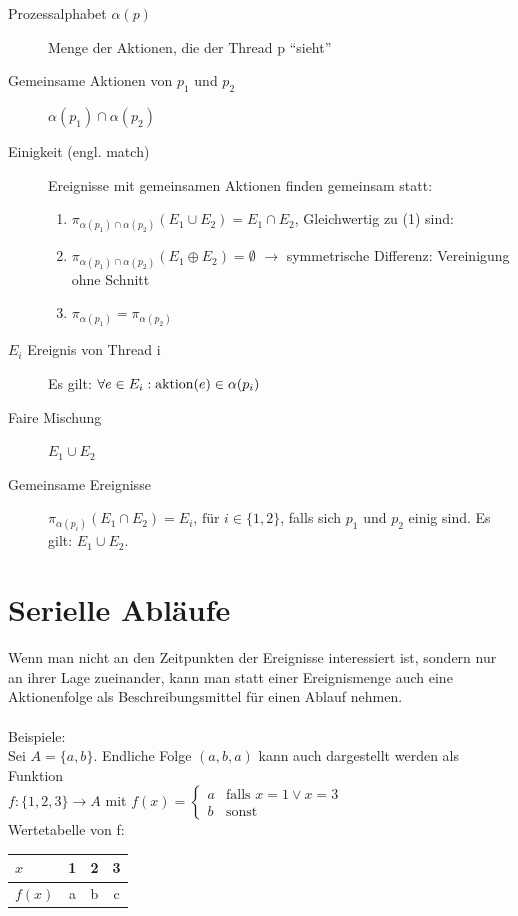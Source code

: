 \begin{description}
	\item[Prozessalphabet $\alpha(p)$] Menge der Aktionen, die der Thread p "`sieht"'
	\item[Gemeinsame Aktionen von $ p_1 $ und $ p_2 $] $ \alpha(p_1) \cap \alpha(p_2) $
	\item[Einigkeit (engl. match)] Ereignisse mit gemeinsamen Aktionen finden gemeinsam statt:
	\begin{enumerate} %
		\item $ \pi_{\alpha(p_1) \cap \alpha(p_2)}(E_1 \cup E_2) = E_1 \cap E_2 $, Gleichwertig zu (1) sind:\\
		\item $ \pi_{\alpha(p_1) \cap \alpha(p_2)}(E_1 \oplus E_2) = \emptyset $ $\rightarrow$ symmetrische Differenz: Vereinigung ohne Schnitt
		\item $ \pi_{\alpha(p_1)} = \pi_{\alpha(p_2)} $
	\end{enumerate}
	\item[$ E_i $ Ereignis von Thread i] Es gilt: $ \forall e \in E_i: \operatorname{aktion}(e) \in \alpha(p_i) $
	\item[Faire Mischung] $ E_1 \cup E_2 $
	\item[Gemeinsame Ereignisse] $ \pi_{\alpha(p_i)}(E_1 \cap E_2) = E_i \text{, für } i \in \{1, 2\} $, falls sich $ p_1 $ und $ p_2 $ einig sind. Es gilt: $ E_1 \cup E_2 $.
\end{description}


\section{Serielle Abläufe}
Wenn man nicht an den Zeitpunkten der Ereignisse interessiert ist, sondern nur an ihrer Lage zueinander, kann man statt einer Ereignismenge auch eine Aktionenfolge als Beschreibungsmittel für einen Ablauf nehmen.\\
\\
Beispiele: \\
Sei $ A = \{a, b\} $. Endliche Folge $ (a, b, a) $ kann auch dargestellt werden als Funktion\\
$ f: \{1, 2, 3\} \rightarrow A $ mit $ f(x) = \begin{cases} a & \text{falls } x = 1 \vee x = 3\\ b & \text{sonst}\end{cases} $\\
Wertetabelle von f:
\begin{center}
	\begin{tabular}{l|c c c}
		$ x $ & 1 & 2 & 3\\ \hline
		$ f(x) $ & a & b & c
	\end{tabular}
\end{center}

